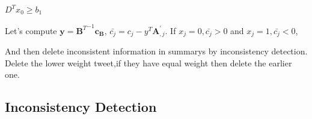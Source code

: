 \documentclass{llncs}
\begin{document}
%

$D^Tx_0\geq b_1$





Let's compute $\mathbf{y} = {\mathbf{B}^T}^{-1}\mathbf{c_B}$, $\bar{c_j} = c_j - y^T\mathbf{A}_{,j}^{'}$. If $x_j = 0, \bar{c_j} > 0$ and $x_j = 1,\bar{c_j} < 0$, 

And then delete inconsistent information in summarys by inconsistency detection. Delete the lower weight tweet,if they have equal weight then delete the earlier one.

\subsection{Inconsistency Detection}
\end{document}
